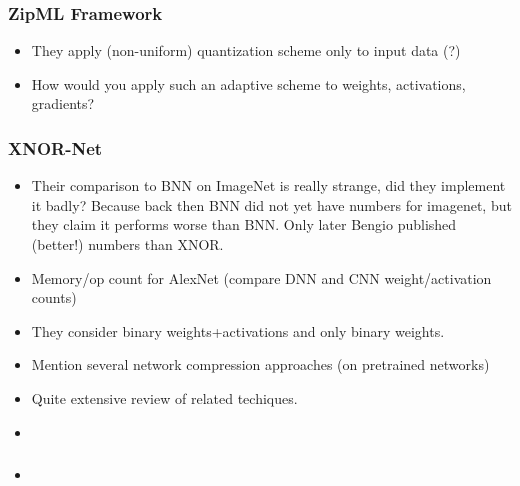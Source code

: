 \documentclass{article}
\begin{document}
\subsubsection*{ZipML Framework}
\begin{itemize}
    \item They apply (non-uniform) quantization scheme only to input data (?)
    \item How would you apply such an adaptive scheme to weights, activations, gradients?
\end{itemize}

\subsubsection*{XNOR-Net}
\begin{itemize}
    \item Their comparison to BNN on ImageNet is really strange, did they implement it
    badly? Because back then BNN did not yet have numbers for imagenet, but they claim
    it performs worse than BNN. Only later Bengio published (better!) numbers than XNOR.
    \item Memory/op count for AlexNet (compare DNN and CNN weight/activation counts)
    \item They consider binary weights+activations and only binary weights.
    \item Mention several network compression approaches (on pretrained networks)
    \item Quite extensive review of related techiques.
    \item 
\end{itemize}

\subsubsection*{}
\begin{itemize}
    \item 
\end{itemize}
\end{document}
